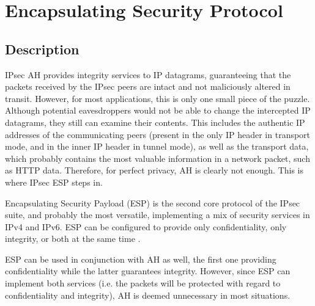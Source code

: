 \documentclass[a4paper,12pt]{report}
\begin{document}
		\section{Encapsulating Security Protocol}
		\subsection{Description}
		IPsec AH provides integrity services to IP datagrams, guaranteeing that the packets received by the IPsec peers are intact and not maliciously altered in transit. However, for most applications, this is only one small piece of the puzzle. Although potential eavesdroppers would not be able to change the intercepted IP datagrams, they still can examine their contents. This includes the authentic IP addresses of the communicating peers (present in the only IP header in transport mode, and in the inner IP header in tunnel mode), as well as the transport data, which probably contains the most valuable information in a network packet, such as HTTP data. Therefore, for perfect privacy, AH is clearly not enough. This is where IPsec ESP steps in.
		
		Encapsulating Security Payload (ESP) is the second core protocol of the IPsec suite, and probably the most versatile, implementing a mix of security services in IPv4 and IPv6. ESP can be configured to provide only confidentiality, only integrity, or both at the same time \cite{rfc4303}.
		
		ESP can be used in conjunction with AH as well, the first one providing confidentiality while the latter guarantees integrity. However, since ESP can implement both services (i.e. the packets will be protected with regard to confidentiality and integrity), AH is deemed unnecessary in most situations.
		
\end{document}
